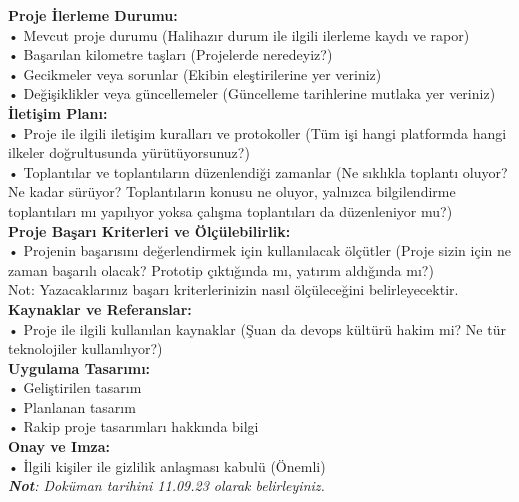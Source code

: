 \documentclass{qjmam}
\renewcommand{\.}{\raisebox{.9mm}{.}}
\begin{document}
\textbf{Proje İlerleme Durumu:}\\
• Mevcut proje durumu (Halihazır durum ile ilgili ilerleme kaydı ve rapor)\\
• Başarılan kilometre taşları (Projelerde neredeyiz?)\\
• Gecikmeler veya sorunlar (Ekibin eleştirilerine yer veriniz)\\
• Değişiklikler veya güncellemeler (Güncelleme tarihlerine mutlaka yer veriniz)\\

\textbf{İletişim Planı:}\\
• Proje ile ilgili iletişim kuralları ve protokoller (Tüm işi hangi platformda hangi ilkeler doğrultusunda yürütüyorsunuz?)\\
• Toplantılar ve toplantıların düzenlendiği zamanlar (Ne sıklıkla toplantı oluyor? Ne kadar sürüyor? Toplantıların konusu ne oluyor, yalnızca bilgilendirme toplantıları mı yapılıyor yoksa çalışma toplantıları da düzenleniyor mu?)\\

\textbf{Proje Başarı Kriterleri ve Ölçülebilirlik:}\\
• Projenin başarısını değerlendirmek için kullanılacak ölçütler (Proje sizin için ne zaman başarılı olacak? Prototip çıktığında mı, yatırım aldığında mı?)\\
Not: Yazacaklarınız başarı kriterlerinizin nasıl ölçüleceğini belirleyecektir.\\

\textbf{Kaynaklar ve Referanslar:}\\
• Proje ile ilgili kullanılan kaynaklar (Şuan da devops kültürü hakim mi? Ne tür teknolojiler kullanılıyor?)\\

\textbf{Uygulama Tasarımı:}\\
• Geliştirilen tasarım\\
• Planlanan tasarım\\
• Rakip proje tasarımları hakkında bilgi\\

\textbf{Onay ve Imza:}\\
• İlgili kişiler ile gizlilik anlaşması kabulü (Önemli)\\

\textit{\textbf{Not}: Doküman tarihini 11.09.23 olarak belirleyiniz.}
\end{document}
